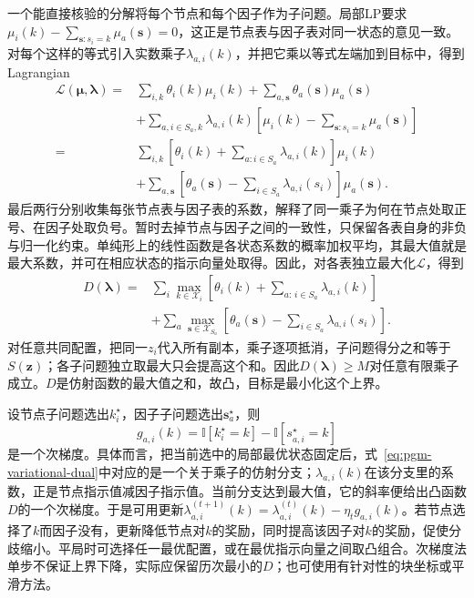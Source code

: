 一个能直接核验的分解将每个节点和每个因子作为子问题。局部LP要求$\mu_i(k)-\sum_{\bm s:s_i=k}\mu_a(\bm s)=0$，这正是节点表与因子表对同一状态的意见一致。对每个这样的等式引入实数乘子$\lambda_{a,i}(k)$，并把它乘以等式左端加到目标中，得到Lagrangian
\[
  \begin{aligned}
    \mathscr L(\bm\mu,\bm\lambda)
      ={}&\sum_{i,k}\theta_i(k)\mu_i(k)
          +\sum_{a,\bm s}\theta_a(\bm s)\mu_a(\bm s)\\
       &+\sum_{a,i\in S_a,k}\lambda_{a,i}(k)
           \left[\mu_i(k)-\sum_{\bm s:s_i=k}\mu_a(\bm s)\right]\\
      ={}&\sum_{i,k}\left[\theta_i(k)+\sum_{a:i\in S_a}\lambda_{a,i}(k)\right]\mu_i(k)\\
       &+\sum_{a,\bm s}\left[\theta_a(\bm s)-\sum_{i\in S_a}\lambda_{a,i}(s_i)\right]\mu_a(\bm s).
  \end{aligned}
\]
最后两行分别收集每张节点表与因子表的系数，解释了同一乘子为何在节点处取正号、在因子处取负号。暂时去掉节点与因子之间的一致性，只保留各表自身的非负与归一化约束。单纯形上的线性函数是各状态系数的概率加权平均，其最大值就是最大系数，并可在相应状态的指示向量处取得。因此，对各表独立最大化$\mathscr L$，得到
\begin{equation}
  \begin{aligned}
    D(\bm{\lambda})
       ={}&\sum_i\max_{k\in\mathcal X_i}
          \left[\theta_i(k)+\sum_{a:\,i\in S_a}\lambda_{a,i}(k)\right]\\
        &+\sum_a\max_{\bm s\in\mathcal X_{S_a}}
          \left[\theta_a(\bm s)-\sum_{i\in S_a}\lambda_{a,i}(s_i)\right].
  \end{aligned}
  \label{eq:pgm-variational-dual}
\end{equation}
对任意共同配置，把同一$z_i$代入所有副本，乘子逐项抵消，子问题得分之和等于$S(\bm z)$；各子问题独立取最大只会提高这个和。因此$D(\bm{\lambda})\geq M$对任意有限乘子成立。$D$是仿射函数的最大值之和，故凸，目标是最小化这个上界。

设节点子问题选出$k_i^\star$，因子子问题选出$\bm s_a^\star$，则
\[
  g_{a,i}(k)=\mathbb I[k_i^\star=k]-\mathbb I[s_{a,i}^\star=k]
\]
是一个次梯度。具体而言，把当前选中的局部最优状态固定后，式~\eqref{eq:pgm-variational-dual}中对应的是一个关于乘子的仿射分支；$\lambda_{a,i}(k)$在该分支里的系数，正是节点指示值减因子指示值。当前分支达到最大值，它的斜率便给出凸函数$D$的一个次梯度。于是可用更新$\lambda_{a,i}^{(t+1)}(k)=\lambda_{a,i}^{(t)}(k)-\eta_t g_{a,i}(k)$。若节点选择了$k$而因子没有，更新降低节点对$k$的奖励，同时提高该因子对$k$的奖励，促使分歧缩小。平局时可选择任一最优配置，或在最优指示向量之间取凸组合。次梯度法单步不保证上界下降，实际应保留历次最小的$D$；也可使用有针对性的块坐标或平滑方法。

